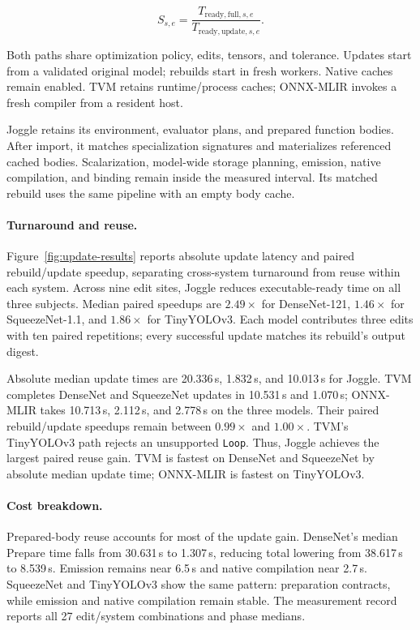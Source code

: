 \[
S_{s,e}=\frac{T_{\mathrm{ready,full},s,e}}{T_{\mathrm{ready,update},s,e}}.
\]

Both paths share optimization policy, edits, tensors, and tolerance. Updates
start from a validated original model; rebuilds start in fresh workers.
Native caches remain enabled. TVM retains runtime/process caches;
ONNX-MLIR invokes a fresh compiler from a resident host.

Joggle retains its environment, evaluator plans, and prepared function bodies.
After import, it matches specialization signatures and materializes referenced
cached bodies. Scalarization, model-wide storage planning, emission, native
compilation, and binding remain inside the measured interval. Its matched
rebuild uses the same pipeline with an empty body cache.

\paragraph{Turnaround and reuse.}
Figure~\ref{fig:update-results} reports absolute update latency and paired
rebuild/update speedup, separating cross-system turnaround from reuse within
each system. Across nine edit sites, Joggle reduces executable-ready time on
all three subjects. Median paired speedups are $2.49\times$ for DenseNet-121,
$1.46\times$ for SqueezeNet-1.1, and $1.86\times$ for TinyYOLOv3. Each model
contributes three edits with ten paired repetitions; every successful update
matches its rebuild's output digest.

Absolute median update times are 20.336\,s, 1.832\,s, and 10.013\,s for Joggle.
TVM completes DenseNet and SqueezeNet updates in 10.531\,s and 1.070\,s;
ONNX-MLIR takes 10.713\,s, 2.112\,s, and 2.778\,s on the three models. Their
paired rebuild/update speedups remain between $0.99\times$ and $1.00\times$.
TVM's TinyYOLOv3 path rejects an unsupported \texttt{Loop}. Thus, Joggle
achieves the largest paired reuse gain. TVM is fastest on DenseNet and
SqueezeNet by absolute median update time; ONNX-MLIR is fastest on TinyYOLOv3.

\paragraph{Cost breakdown.}
Prepared-body reuse accounts for most of the update gain. DenseNet's median
Prepare time falls from 30.631\,s to 1.307\,s, reducing total lowering from
38.617\,s to 8.539\,s. Emission remains near 6.5\,s and native compilation near
2.7\,s. SqueezeNet and TinyYOLOv3 show the same pattern: preparation contracts,
while emission and native compilation remain stable. The measurement record reports
all 27 edit/system combinations and phase medians.


